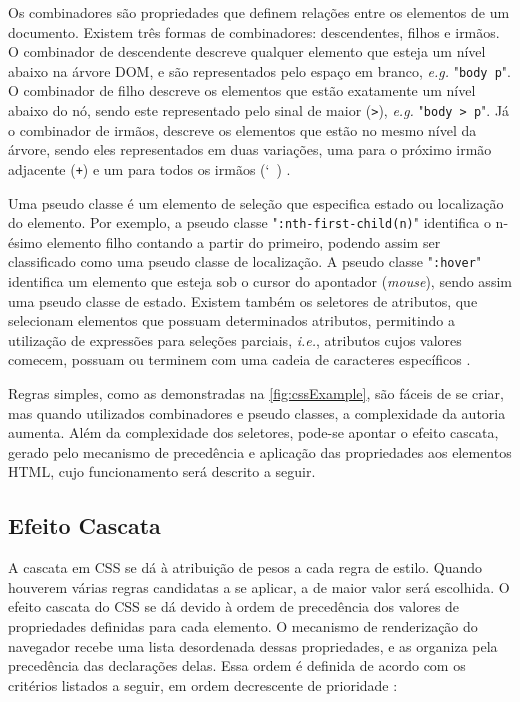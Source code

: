Os combinadores são propriedades que definem relações entre os elementos de um documento. Existem três formas de combinadores: descendentes, filhos e irmãos. O combinador de descendente descreve qualquer elemento que esteja um nível abaixo na árvore DOM, e são representados pelo espaço em branco, \textit{e.g.} "\texttt{body p}". O combinador de filho descreve os elementos que estão exatamente um nível abaixo do nó, sendo este representado pelo sinal de maior (\texttt{>}), \textit{e.g.} "\texttt{body > p}". Já o combinador de irmãos, descreve os elementos que estão no mesmo nível da árvore, sendo eles representados em duas variações, uma para o próximo irmão adjacente (\texttt{+}) e um para todos os irmãos (\char`~) \cite{CSSspec2009}.

Uma pseudo classe é um elemento de seleção que especifica estado ou localização do elemento. Por exemplo, a pseudo classe "\texttt{:nth-first-child(n)}" identifica o n-ésimo elemento filho contando a partir do primeiro, podendo assim ser classificado como uma pseudo classe de localização. A pseudo classe "\texttt{:hover}" identifica um elemento que esteja sob o cursor do apontador (\textit{mouse}), sendo assim uma pseudo classe de estado.  Existem também os seletores de atributos, que selecionam elementos que possuam determinados atributos, permitindo a utilização de expressões para seleções parciais, \textit{i.e.}, atributos cujos valores comecem, possuam ou terminem com uma cadeia de caracteres específicos \cite{CSSspec2009}.

Regras simples, como as demonstradas na \autoref{fig:cssExample}, são fáceis de se criar, mas quando utilizados combinadores e pseudo classes, a complexidade da autoria aumenta. Além da complexidade dos seletores, pode-se apontar o efeito cascata, gerado pelo mecanismo de precedência e aplicação das propriedades aos elementos HTML, cujo funcionamento será descrito a seguir.

\subsection{Efeito Cascata}
\label{subsec:cascade}

A cascata em CSS se dá à atribuição de pesos a cada regra de estilo. Quando houverem várias regras candidatas a se aplicar, a de maior valor será escolhida. O efeito cascata do CSS se dá devido à ordem de precedência dos valores de propriedades definidas para cada elemento. O mecanismo de renderização do navegador recebe uma lista desordenada dessas propriedades, e as organiza pela precedência das declarações delas. Essa ordem é definida de acordo com os critérios listados a seguir, em ordem decrescente de prioridade \cite{CSScascade2015}:


